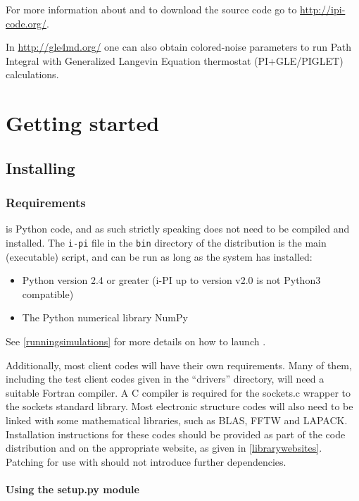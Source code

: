 \documentclass[11pt,english,fleqn]{report}
\begin{document}
For more information about \ipi{} and to download the source code
go to \url{http://ipi-code.org/}. 

In \url{http://gle4md.org/} one can also obtain colored-noise
parameters to run Path Integral with Generalized Langevin Equation
thermostat (PI+GLE/PIGLET) calculations.


\chapter{Getting started}

\label{getstarted}


\section{Installing \ipi}

\label{install}


\subsection{Requirements}

\ipi is Python code, and as such strictly speaking does not 
need to be compiled and installed. The {\tt i-pi} file in the
{\tt bin} directory of the distribution is the main (executable) script, 
and can be run as long as the system has installed:
\begin{itemize}
\item Python version 2.4 or greater (i-PI up to version v2.0 is not Python3 compatible)
\item The Python numerical library NumPy
\end{itemize}
See \ref{runningsimulations} for more details on how to launch
\ipi.

Additionally, most client codes will have their own requirements.
Many of them, including the test client codes given in the {}``drivers''
directory, will need a suitable Fortran compiler. A C compiler is
required for the sockets.c wrapper to the sockets standard library.
Most electronic structure codes will also need to be linked with some
mathematical libraries, such as BLAS, FFTW and LAPACK. Installation
instructions for these codes should be provided as part of the code
distribution and on the appropriate website, as given in \ref{librarywebsites}.
Patching for use with \ipi{} should not introduce further dependencies.

\subsubsection{Using the setup.py module}
\end{document}
